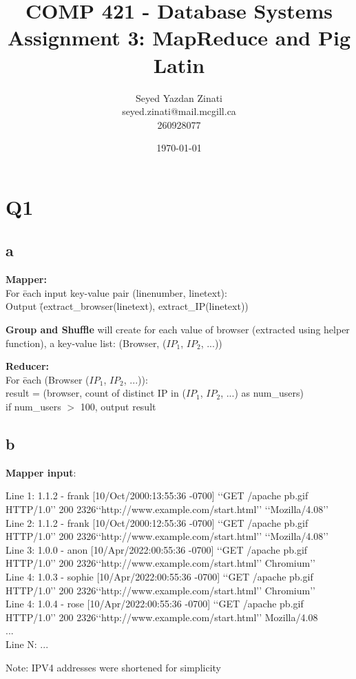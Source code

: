 \documentclass[10pt, letterpaper]{article}
\title{COMP 421 - Database Systems \\ 
\large Assignment 3: MapReduce and Pig Latin}
\author{Seyed Yazdan Zinati\\seyed.zinati@mail.mcgill.ca\\ 260928077}
\date{\today}
\begin{document}
\maketitle

\section*{Q1}
\subsection*{a}
\begin{tabbing}
    \textbf{Mapper:}\\
    For \= each input key-value pair (linenumber, linetext): \\
    \> Output \= (extract\_browser(linetext), extract\_IP(linetext)) \\
\end{tabbing}

\noindent \textbf{Group and Shuffle} will create for each value of browser (extracted using helper function), a key-value list:
(Browser, ($IP_1$, $IP_2$, ...))

\begin{tabbing}
    \textbf{Reducer:}\\
    For \= each (Browser ($IP_1$, $IP_2$, ...)):\\
    \> result = (browser, count of distinct IP in ($IP_1$, $IP_2$, ...) as num\_users)\\
    \> if num\_users $>$ 100, output result\\
\end{tabbing}

\subsection*{b}
\textbf{Mapper input}: \\
\begin{tiny}
    Line 1: 1.1.2 - frank [10/Oct/2000:13:55:36 -0700] ‘‘GET /apache pb.gif HTTP/1.0’’ 200 2326‘‘http://www.example.com/start.html’’ ‘‘Mozilla/4.08’’\\
    Line 2: 1.1.2 - frank [10/Oct/2000:12:55:36 -0700] ‘‘GET /apache pb.gif HTTP/1.0’’ 200 2326‘‘http://www.example.com/start.html’’ ‘‘Mozilla/4.08’’\\
    Line 3: 1.0.0 - anon [10/Apr/2022:00:55:36 -0700] ‘‘GET /apache pb.gif HTTP/1.0’’ 200 2326‘‘http://www.example.com/start.html’’ Chromium’’\\
    Line 4: 1.0.3 - sophie [10/Apr/2022:00:55:36 -0700] ‘‘GET /apache pb.gif HTTP/1.0’’ 200 2326‘‘http://www.example.com/start.html’’ Chromium’’\\
    Line 4: 1.0.4 - rose [10/Apr/2022:00:55:36 -0700] ‘‘GET /apache pb.gif HTTP/1.0’’ 200 2326‘‘http://www.example.com/start.html’’ Mozilla/4.08\\
    ...\\
    Line N: ...\\
\end{tiny}
Note: IPV4 addresses were shortened for simplicity\\
\end{document}
